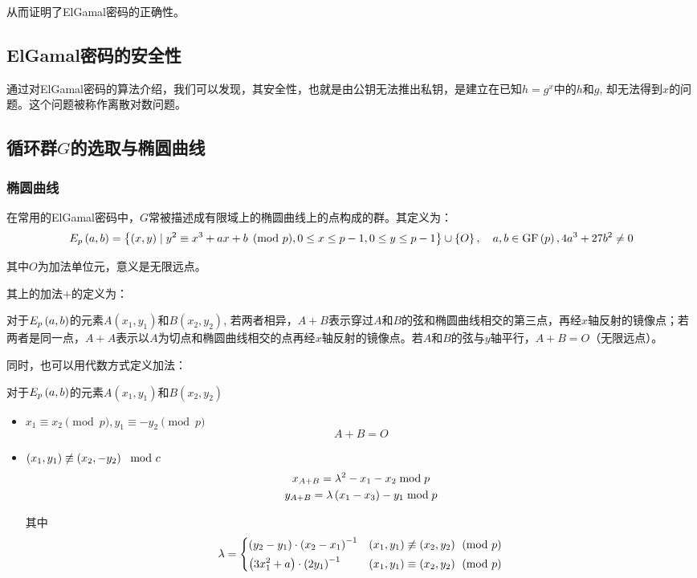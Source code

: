 从而证明了ElGamal密码的正确性。
\subsection{ElGamal密码的安全性}
通过对ElGamal密码的算法介绍，我们可以发现，其安全性，也就是由公钥无法推出私钥，是建立在已知$h=g^x$中的$h$和$g$, 却无法得到$x$的问题。这个问题被称作离散对数问题。
\subsection{循环群$G$的选取与椭圆曲线}
\subsubsection{椭圆曲线}
在常用的ElGamal密码中，$G$常被描述成有限域上的椭圆曲线上的点构成的群。其定义为：
\begin{equation}
E_p\left( {a, b}\right)=\left\{ {\left( {x, y}\right)\mid y^2\equiv x^3+ax+b\pmod{p}, 0\leq x\leq p-1, 0\leq y\leq p-1} \right\}\cup \left\{ {O} \right\},\quad a,b\in\mathrm{GF}\left( {p}\right), 4a^3+27b^2\neq 0
\end{equation}

其中$O$为加法单位元，意义是无限远点。\par
其上的加法$+$的定义为：\par
对于$E_p\left( {a, b}\right)$的元素$A(x_1, y_1)$和$B(x_2, y_2)$, 若两者相异，$A+B$表示穿过$A$和$B$的弦和椭圆曲线相交的第三点，再经$x$轴反射的镜像点；若两者是同一点，$A+A$表示以$A$为切点和椭圆曲线相交的点再经$x$轴反射的镜像点。若$A$和$B$的弦与$y$轴平行，$A+B=O$（无限远点）。\par
同时，也可以用代数方式定义加法：\par
对于$E_p\left( {a, b}\right)$的元素$A(x_1, y_1)$和$B(x_2, y_2)$
\begin{itemize}
	\item $x_1\equiv x_2\pmod{p}, y_1\equiv -y_2\pmod{p}$
	\[A+B=O\]
	\item $\left( {x_1, y_1}\right)\not\equiv\left( {x_2, -y_2}\right)\mod{c}$
	\begin{gather}
	x_{A+B}=\lambda^2-x_1-x_2\bmod{p}\\
	y_{A+B}=\lambda\left( {x_1-x_3}\right)-y_1\bmod{p}
	\end{gather}

	其中
	\begin{equation}
	\lambda=\begin{dcases}\left( {y_2-y_1}\right)\cdot\left( {x_2-x_1}\right)^{-1}&\left( {x_1, y_1}\right)\not\equiv \left( {x_2, y_2}\right)\pmod{p}\\\left( {3x_1^2+a}\right)\cdot\left( {2y_1}\right)^{-1}&\left( {x_1, y_1}\right)\equiv\left( {x_2, y_2}\right)\pmod{p}\end{dcases}
	\end{equation}
\end{itemize}

